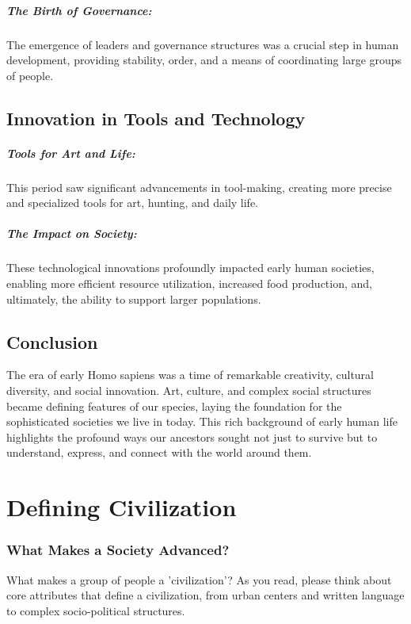 \documentclass{book}
\begin{document}
\paragraph{The Birth of Governance:}
The emergence of leaders and governance structures was a crucial step in human development, providing stability, order, and a means of coordinating large groups of people.

\section*{Innovation in Tools and Technology}

\paragraph{Tools for Art and Life:}
This period saw significant advancements in tool-making, creating more precise and specialized tools for art, hunting, and daily life.

\paragraph{The Impact on Society:}
These technological innovations profoundly impacted early human societies, enabling more efficient resource utilization, increased food production, and, ultimately, the ability to support larger populations.

\section*{Conclusion}

The era of early Homo sapiens was a time of remarkable creativity, cultural diversity, and social innovation. Art, culture, and complex social structures became defining features of our species, laying the foundation for the sophisticated societies we live in today. This rich background of early human life highlights the profound ways our ancestors sought not just to survive but to understand, express, and connect with the world around them.

\chapter{Defining Civilization}
\subsection*{What Makes a Society Advanced?}
What makes a group of people a 'civilization'? As you read, please think about core attributes that define a civilization, from urban centers and written language to complex socio-political structures.
\end{document}
